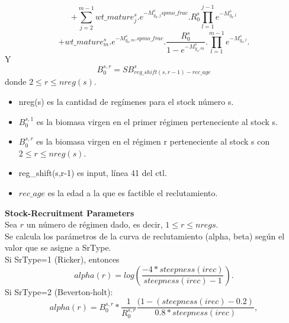 \documentclass{article}
\begin{document}
\begin{equation*}
    +\sum_{j=2}^{m-1}wt\_mature^s_j.e^{-M^s_{y_0,j} spmo\_frac}.R^s_0\prod_{l=1}^{j-1}e^{-M^s_{y_0,l}} 
\end{equation*}
\begin{equation*}
    + wt\_mature^s_{m}.e^{-M^s_{y_0,m}.spmo\_frac}.\dfrac{R^s_0}{1-e^{-M^s_{y_0,m}}}.\prod_{l=1}^{m-1}e^{-M^s_{y_0,l}}.
\end{equation*}
Y
\begin{equation}
    B^{s,r}_0 = SB^s_{reg\_shift(s,r-1)-rec\_age}
\end{equation}
donde $2\leq r \leq nreg(s)$.
\begin{itemize}
    \item nreg(s) es la cantidad de regímenes para el stock número s.
    \item %
    $B^{s,1}_0$ es la biomasa virgen en el primer régimen perteneciente al stock s.
    \item  %
    $B^{s,r}_0$ es la biomasa virgen en el régimen r perteneciente al stock s con $2\leq r \leq nreg(s)$.
    \item reg\_shift(s,r-1) es input, línea 41 del ctl.
    \item $rec\_age$ es la edad a la que es factible el reclutamiento.
\end{itemize}
\textbf{Stock-Recruitment Parameters}\\
Sea $r$ un número de régimen dado, es decir, $1\leq r \leq nregs$.\\
Se calcula los parámetros de la curva de reclutamiento (alpha, beta) según el valor que se asigne a SrType.\\
Si SrType=1 (Ricker), entonces
\begin{equation}
alpha(r)=log\left(\dfrac{-4*steepness(irec)}{steepness(irec)-1}\right).
\end{equation}
Si SrType=2 (Beverton-holt):
\begin{equation}
    alpha(r) = B^{s,r}_0*\dfrac{1}{R^{s,r}_0}\dfrac{(1-(steepness(irec)-0.2)}{0.8*steepness(irec)},
\end{equation}
\end{document}
